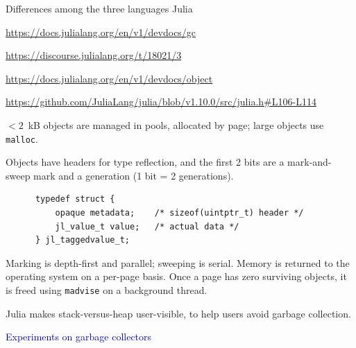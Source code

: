 \documentclass[aspectratio=169]{beamer}
\begin{document}
\begin{frame}[fragile]{Differences among the three languages}
\vspace{0.1 cm}
\Huge
Julia \hfill {\tiny \begin{minipage}{0.8\linewidth}\hfill \textcolor{blue}{\url{https://docs.julialang.org/en/v1/devdocs/gc}}

\hfill \textcolor{blue}{\url{https://discourse.julialang.org/t/18021/3}}

\hfill \textcolor{blue}{\url{https://docs.julialang.org/en/v1/devdocs/object}}

\hfill \textcolor{blue}{\url{https://github.com/JuliaLang/julia/blob/v1.10.0/src/julia.h\#L106-L114}}\end{minipage}}

\vspace{0.25 cm}
\normalsize
$< 2$~kB objects are managed in pools, allocated by page; large objects use \texttt{malloc}.

\vspace{0.2 cm}
Objects have headers for type reflection, and the first 2 bits are a mark-and-sweep mark and a generation (1 bit = 2 generations).

\small
\begin{verbatim}
      typedef struct {
          opaque metadata;    /* sizeof(uintptr_t) header */
          jl_value_t value;   /* actual data */
      } jl_taggedvalue_t;
\end{verbatim}

\vspace{0.2 cm}
\normalsize
Marking is depth-first and parallel; sweeping is serial. Memory is returned to the operating system on a per-page basis. Once a page has zero surviving objects, it is freed using \texttt{madvise} on a background thread.

\vspace{0.2 cm}
Julia makes stack-versus-heap user-visible, to help users avoid garbage collection.
\end{frame}

\begin{frame}{}
\LARGE
\begin{center}
\textcolor{darkblue}{Experiments on garbage collectors}
\end{center}
\end{frame}
\end{document}
